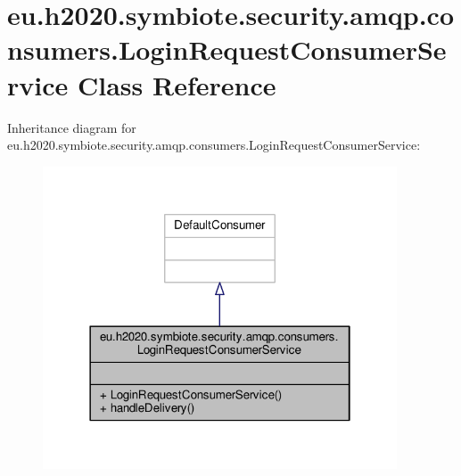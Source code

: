 \hypertarget{classeu_1_1h2020_1_1symbiote_1_1security_1_1amqp_1_1consumers_1_1LoginRequestConsumerService}{}\section{eu.\+h2020.\+symbiote.\+security.\+amqp.\+consumers.\+Login\+Request\+Consumer\+Service Class Reference}
\label{classeu_1_1h2020_1_1symbiote_1_1security_1_1amqp_1_1consumers_1_1LoginRequestConsumerService}


Inheritance diagram for eu.\+h2020.\+symbiote.\+security.\+amqp.\+consumers.\+Login\+Request\+Consumer\+Service\+:
\nopagebreak
\begin{figure}[H]
\begin{center}
\leavevmode
\includegraphics[width=298pt]{classeu_1_1h2020_1_1symbiote_1_1security_1_1amqp_1_1consumers_1_1LoginRequestConsumerService__inherit__graph}
\end{center}
\end{figure}


